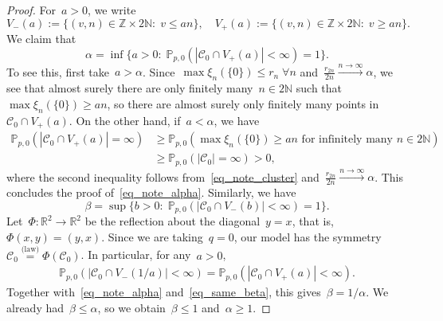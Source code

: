 \documentclass[10pt,a4paper]{amsart}
\newcommand{\cC}{\ensuremath{\mathcal C}}
\begin{document}
\begin{proof}
For~$a > 0$, we write
\[V_-(a):= \{(v,n) \in \mathbb Z \times 2 \mathbb N:\; v \le an\},\quad V_+(a):=\{(v,n) \in \mathbb Z \times 2 \mathbb N:\; v \ge an\}.\]
 We claim that
\begin{equation}
\label{eq_note_alpha}
    \alpha = \inf\{a > 0:\; \mathbb P_{p,0}(|\cC_0 \cap V_+(a)| < \infty) = 1\}.
\end{equation}
To see this, first take~$a > \alpha$. Since~$\max \xi_n(\{0\}) \le r_n \; \forall n$ and~$\frac{r_{2n}}{2n} \xrightarrow{n \to \infty} \alpha$, we see that almost surely there are only finitely many~$n \in 2 \mathbb N$ such that~$\max \xi_n(\{0\}) \ge an$, so there are almost surely only finitely many points in~$\cC_0 \cap V_+(a)$. On the other hand, if~$a < \alpha$, we have
\begin{align*}
\mathbb P_{p,0}(|\cC_0 \cap V_+(a)| = \infty) &\ge \mathbb P_{p,0}(\max \xi_n(\{0\}) \ge an \text{ for infinitely many } n \in 2 \mathbb N) \\
    &\ge \mathbb P_{p,0}(|\cC_0| = \infty) > 0,
\end{align*}
where the second inequality follows from~\eqref{eq_note_cluster} and~$\frac{r_{2n}}{2n} \xrightarrow{n \to \infty} \alpha$. This concludes the proof of~\eqref{eq_note_alpha}. Similarly, we have
\begin{equation}
    \label{eq_same_beta}
\beta = \sup\{b > 0:\; \mathbb P_{p,0}(|\cC_0 \cap V_-(b)| < \infty) = 1\}.
\end{equation}
Let~$\Phi: \mathbb R^2 \to \mathbb R^2$ be the reflection about the diagonal~$y=x$, that is,~$\Phi(x,y) = (y,x)$. Since we are taking~$q = 0$, our model has the symmetry~$\cC_0 \stackrel{\text{(law)}}{=} \Phi(\cC_0)$. In particular, for any~$a > 0$,
	\begin{align*}
		\mathbb P_{p,0}( | \cC_0 \cap V_-(1/a) | < \infty) =\mathbb P_{p,0}( |\cC_0 \cap V_+(a)| < \infty).
	\end{align*}
	Together with~\eqref{eq_note_alpha} and~\eqref{eq_same_beta}, this gives~$\beta = 1/\alpha$. We already had~$\beta \le \alpha$, so we obtain~$\beta \le 1$ and~$\alpha \ge 1$.
\end{proof}
\end{document}
